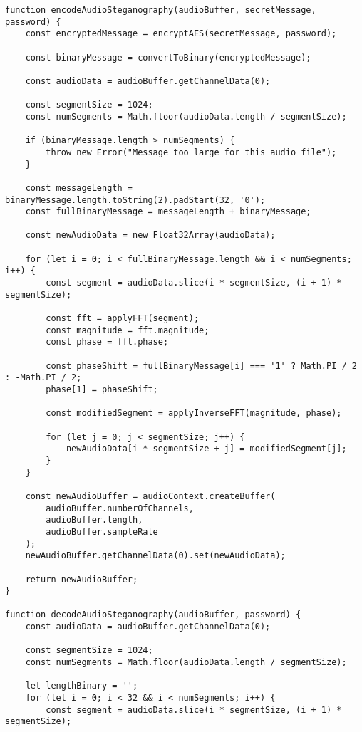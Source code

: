 \documentclass[12pt, a4paper, oneside]{book}
\begin{document}
\begin{verbatim}
function encodeAudioSteganography(audioBuffer, secretMessage, password) {
    const encryptedMessage = encryptAES(secretMessage, password);

    const binaryMessage = convertToBinary(encryptedMessage);

    const audioData = audioBuffer.getChannelData(0);

    const segmentSize = 1024;
    const numSegments = Math.floor(audioData.length / segmentSize);

    if (binaryMessage.length > numSegments) {
        throw new Error("Message too large for this audio file");
    }

    const messageLength = binaryMessage.length.toString(2).padStart(32, '0');
    const fullBinaryMessage = messageLength + binaryMessage;

    const newAudioData = new Float32Array(audioData);

    for (let i = 0; i < fullBinaryMessage.length && i < numSegments; i++) {
        const segment = audioData.slice(i * segmentSize, (i + 1) * segmentSize);

        const fft = applyFFT(segment);
        const magnitude = fft.magnitude;
        const phase = fft.phase;

        const phaseShift = fullBinaryMessage[i] === '1' ? Math.PI / 2 : -Math.PI / 2;
        phase[1] = phaseShift;

        const modifiedSegment = applyInverseFFT(magnitude, phase);

        for (let j = 0; j < segmentSize; j++) {
            newAudioData[i * segmentSize + j] = modifiedSegment[j];
        }
    }

    const newAudioBuffer = audioContext.createBuffer(
        audioBuffer.numberOfChannels,
        audioBuffer.length,
        audioBuffer.sampleRate
    );
    newAudioBuffer.getChannelData(0).set(newAudioData);

    return newAudioBuffer;
}

function decodeAudioSteganography(audioBuffer, password) {
    const audioData = audioBuffer.getChannelData(0);

    const segmentSize = 1024;
    const numSegments = Math.floor(audioData.length / segmentSize);

    let lengthBinary = '';
    for (let i = 0; i < 32 && i < numSegments; i++) {
        const segment = audioData.slice(i * segmentSize, (i + 1) * segmentSize);


\end{verbatim}
\end{document}
